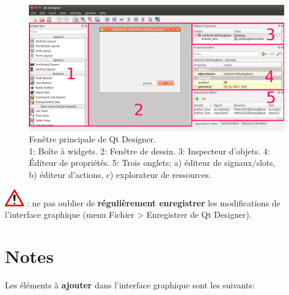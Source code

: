 \documentclass[11pt]{article}
\begin{document}
\begin{enumerate}
\begin{itemize}
\end{itemize}

\begin{figure}[H]
    \centering
    \includegraphics[width=1\textwidth]{qtdesigner5w2.png}
    \vspace*{-1.44em}
    \caption[Fenêtre principale de Qt Designer.]{Fenêtre principale de Qt Designer.\\ 1: Boîte à widgets. 2: Fenêtre de dessin. 3: Inspecteur d'objets. 4: Éditeur de propriétés. 5: Trois onglets; a) éditeur de signaux/slots, b) éditeur d'actions, c) explorateur de ressources.}
    \label{qt}
\end{figure}



\includegraphics[scale=1]{warningt.png} \underline{}: ne pas oublier de \textbf{régulièrement enregistrer} les modifications de l'interface graphique (menu \og{}Fichier > Enregistrer \fg{} de \og{}Qt Designer\fg{}). 


\section*{Notes}
\hrulefill
\vspace*{1.6em}

\hrulefill
\vspace*{1.6em}

\hrulefill
\vspace*{1.6em}

\hrulefill
\vspace*{1.6em}










\newpage{}
Les éléments à \textbf{ajouter} dans l'interface graphique sont les suivants:


\end{enumerate}
\end{document}

